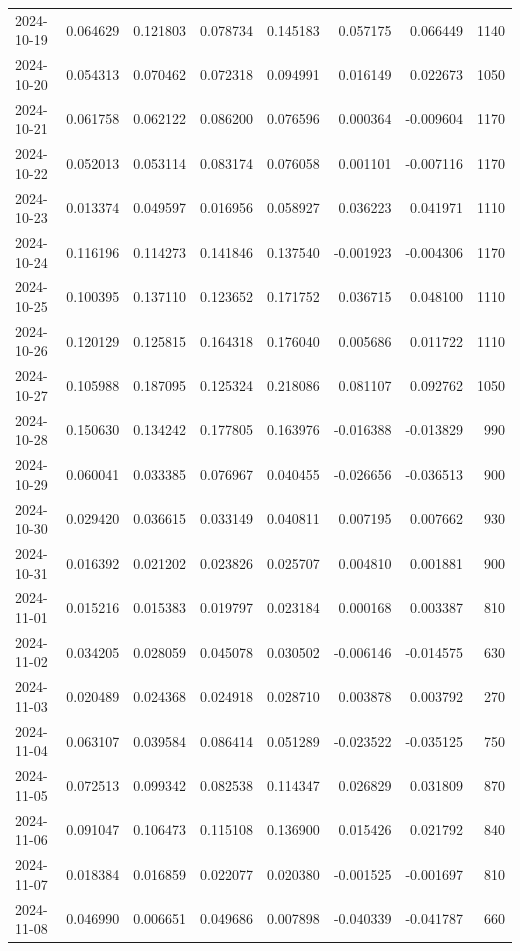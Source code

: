 \begin{tabular}{lrrrrrrr}
2024-10-19 & 0.064629 & 0.121803 & 0.078734 & 0.145183 & 0.057175 & 0.066449 & 1140 \\
2024-10-20 & 0.054313 & 0.070462 & 0.072318 & 0.094991 & 0.016149 & 0.022673 & 1050 \\
2024-10-21 & 0.061758 & 0.062122 & 0.086200 & 0.076596 & 0.000364 & -0.009604 & 1170 \\
2024-10-22 & 0.052013 & 0.053114 & 0.083174 & 0.076058 & 0.001101 & -0.007116 & 1170 \\
2024-10-23 & 0.013374 & 0.049597 & 0.016956 & 0.058927 & 0.036223 & 0.041971 & 1110 \\
2024-10-24 & 0.116196 & 0.114273 & 0.141846 & 0.137540 & -0.001923 & -0.004306 & 1170 \\
2024-10-25 & 0.100395 & 0.137110 & 0.123652 & 0.171752 & 0.036715 & 0.048100 & 1110 \\
2024-10-26 & 0.120129 & 0.125815 & 0.164318 & 0.176040 & 0.005686 & 0.011722 & 1110 \\
2024-10-27 & 0.105988 & 0.187095 & 0.125324 & 0.218086 & 0.081107 & 0.092762 & 1050 \\
2024-10-28 & 0.150630 & 0.134242 & 0.177805 & 0.163976 & -0.016388 & -0.013829 & 990 \\
2024-10-29 & 0.060041 & 0.033385 & 0.076967 & 0.040455 & -0.026656 & -0.036513 & 900 \\
2024-10-30 & 0.029420 & 0.036615 & 0.033149 & 0.040811 & 0.007195 & 0.007662 & 930 \\
2024-10-31 & 0.016392 & 0.021202 & 0.023826 & 0.025707 & 0.004810 & 0.001881 & 900 \\
2024-11-01 & 0.015216 & 0.015383 & 0.019797 & 0.023184 & 0.000168 & 0.003387 & 810 \\
2024-11-02 & 0.034205 & 0.028059 & 0.045078 & 0.030502 & -0.006146 & -0.014575 & 630 \\
2024-11-03 & 0.020489 & 0.024368 & 0.024918 & 0.028710 & 0.003878 & 0.003792 & 270 \\
2024-11-04 & 0.063107 & 0.039584 & 0.086414 & 0.051289 & -0.023522 & -0.035125 & 750 \\
2024-11-05 & 0.072513 & 0.099342 & 0.082538 & 0.114347 & 0.026829 & 0.031809 & 870 \\
2024-11-06 & 0.091047 & 0.106473 & 0.115108 & 0.136900 & 0.015426 & 0.021792 & 840 \\
2024-11-07 & 0.018384 & 0.016859 & 0.022077 & 0.020380 & -0.001525 & -0.001697 & 810 \\
2024-11-08 & 0.046990 & 0.006651 & 0.049686 & 0.007898 & -0.040339 & -0.041787 & 660 \\

\end{tabular}
